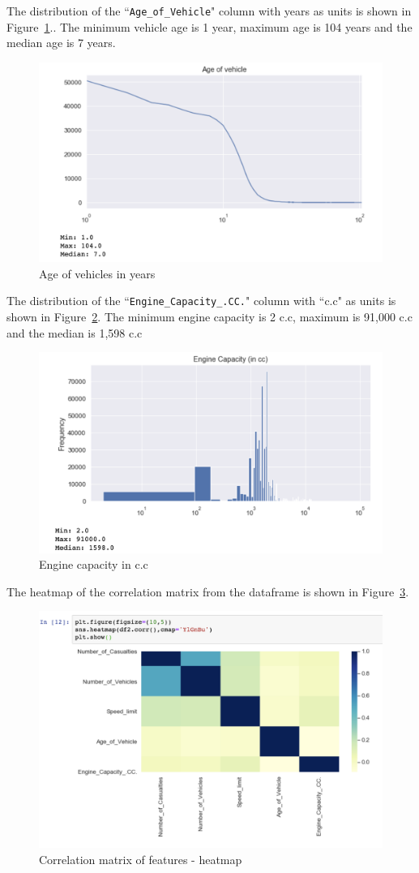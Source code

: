 \documentclass[12pt]{article}
\begin{document}
The distribution of the ``\verb|Age_of_Vehicle|" column with years as units is shown in Figure~\ref{fig4}.. The minimum vehicle age is 1 year, maximum age is 104 years and the median age is 7 years.
\begin{figure}[h!]
\centering
\includegraphics[width=0.8\linewidth]{"./figs/fig4"}
\caption{Age of vehicles in years}
\label{fig4}
\end{figure}
The distribution of the ``\verb|Engine_Capacity_.CC.|" column with ``c.c" as units is shown in Figure~\ref{fig5}. The minimum engine capacity is 2 c.c, maximum is 91,000 c.c and the median is  1,598 c.c
\begin{figure}[h!]
\centering
\includegraphics[width=0.8\linewidth]{"./figs/fig5"}
\caption{Engine capacity in c.c}
\label{fig5}
\end{figure}
The heatmap of the correlation matrix from the dataframe is shown in Figure~\ref{fig6}.
\begin{figure}[h!]
\centering
\includegraphics[width=0.8\linewidth]{"./figs/fig6"}
\caption{Correlation matrix of features - heatmap}
\label{fig6}
\end{figure}
\end{document}
